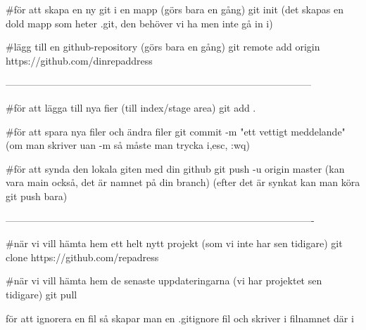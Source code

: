 #för att skapa en ny git i en mapp (görs bara en gång)
        git init
        (det skapas en dold mapp som heter .git, den behöver vi ha men inte gå in i)


#lägg till en github-repository (görs bara en gång)
        git remote add origin https://github.com/dinrepaddress

---------------------------------------------------------------------------------------------

#för att lägga till nya fier (till index/stage area)
        git add .

#för att spara nya filer och ändra filer
       git commit -m "ett vettigt meddelande"
       (om man skriver uan -m så måste man trycka i,esc, :wq)
 
#för att synda den lokala giten med din github
        git push -u origin master (kan vara main också, det är namnet på din branch)
        (efter det är synkat kan man köra git push bara)

----------------------------------------------------------------------------------------------

#när vi vill hämta hem ett helt nytt projekt (som vi inte har sen tidigare)
     git clone https://github.com/repadress

#när vi vill hämta hem de senaste uppdateringarna (vi har projektet sen tidigare) 
    git pull



för att ignorera en fil så skapar man en .gitignore fil och skriver i filnamnet där i 


